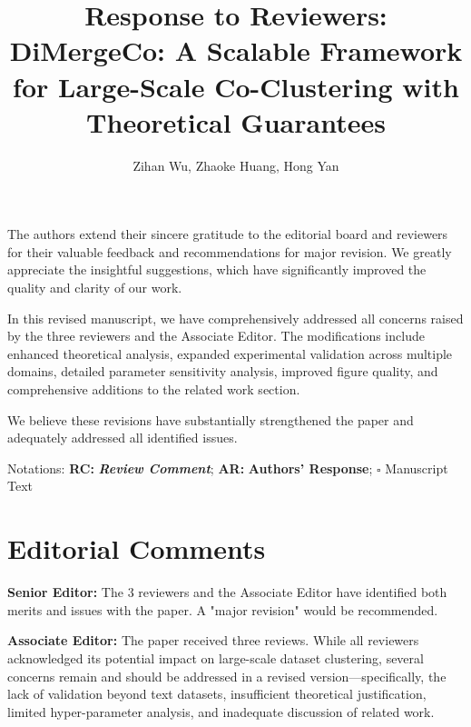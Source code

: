 \documentclass{ar2rc}
\title{Response to Reviewers:\\
DiMergeCo: A Scalable Framework for Large-Scale Co-Clustering with Theoretical Guarantees}
\author{Zihan Wu, Zhaoke Huang, Hong Yan}
\theoremstyle{definition}
\theoremstyle{remark} %
\begin{document}
\maketitle

\noindent
The authors extend their sincere gratitude to the editorial board and reviewers for their valuable feedback and recommendations for major revision. We greatly appreciate the insightful suggestions, which have significantly improved the quality and clarity of our work.

In this revised manuscript, we have comprehensively addressed all concerns raised by the three reviewers and the Associate Editor. The modifications include enhanced theoretical analysis, expanded experimental validation across multiple domains, detailed parameter sensitivity analysis, improved figure quality, and comprehensive additions to the related work section.

We believe these revisions have substantially strengthened the paper and adequately addressed all identified issues.

Notations: \textbf{RC:} \textbf{\textit{Review Comment}}; \textbf{AR:} \textbf{Authors' Response}; $\square$ Manuscript Text


\section{Editorial Comments}

\textbf{Senior Editor:} The 3 reviewers and the Associate Editor have identified both merits and issues with the paper. A "major revision" would be recommended.

\textbf{Associate Editor:} The paper received three reviews. While all reviewers acknowledged its potential impact on large-scale dataset clustering, several concerns remain and should be addressed in a revised version—specifically, the lack of validation beyond text datasets, insufficient theoretical justification, limited hyper-parameter analysis, and inadequate discussion of related work.

\end{document}
